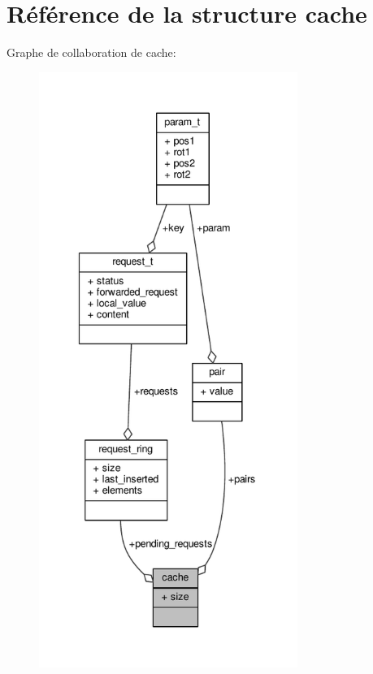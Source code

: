 \hypertarget{structcache}{\section{Référence de la structure cache}
\label{structcache}
}


Graphe de collaboration de cache\+:\nopagebreak
\begin{figure}[H]
\begin{center}
\leavevmode
\includegraphics[height=550pt]{structcache__coll__graph}
\end{center}
\end{figure}
